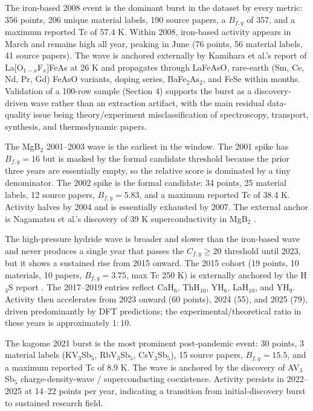 \documentclass[11pt]{article}
\begin{document}
The iron-based 2008 event is the dominant burst in the dataset by every metric: 356 points, 206 unique material labels, 190 source papers, a $B_{f,y}$ of 357, and a maximum reported Tc of 57.4 K. Within 2008, iron-based activity appears in March and remains high all year, peaking in June (76 points, 56 material labels, 41 source papers). The wave is anchored externally by Kamihara et al.'s report of La[O$_{1-x}$F$_x$]FeAs at 26 K \cite{kamihara2008iron} and propagates through LaFeAsO, rare-earth (Sm, Ce, Nd, Pr, Gd) FeAsO variants, doping series, BaFe$_2$As$_2$, and FeSe within months. Validation of a 100-row sample (Section 4) supports the burst as a discovery-driven wave rather than an extraction artifact, with the main residual data-quality issue being theory/experiment misclassification of spectroscopy, transport, synthesis, and thermodynamic papers.

The MgB$_2$ 2001--2003 wave is the earliest in the window. The 2001 spike has $B_{f,y}=16$ but is masked by the formal candidate threshold because the prior three years are essentially empty, so the relative score is dominated by a tiny denominator. The 2002 spike is the formal candidate: 34 points, 25 material labels, 12 source papers, $B_{f,y}=5.83$, and a maximum reported Tc of 38.4 K. Activity halves by 2004 and is essentially exhausted by 2007. The external anchor is Nagamatsu et al.'s discovery of 39 K superconductivity in MgB$_2$ \cite{nagamatsu2001mgb2}.

The high-pressure hydride wave is broader and slower than the iron-based wave and never produces a single year that passes the $C_{f,y}\geq 20$ threshold until 2023, but it shows a sustained rise from 2015 onward. The 2015 cohort (19 points, 10 materials, 10 papers, $B_{f,y}=3.75$, max Tc 250 K) is externally anchored by the H$_3$S report \cite{drozdov2015h3s}. The 2017--2019 entries reflect CaH$_6$, ThH$_{10}$, YH$_6$, LaH$_{10}$, and YH$_9$. Activity then accelerates from 2023 onward (60 points), 2024 (55), and 2025 (79), driven predominantly by DFT predictions; the experimental/theoretical ratio in these years is approximately $1{:}10$.

The kagome 2021 burst is the most prominent post-pandemic event: 30 points, 3 material labels (KV$_3$Sb$_5$, RbV$_3$Sb$_5$, CsV$_3$Sb$_5$), 15 source papers, $B_{f,y}=15.5$, and a maximum reported Tc of 8.9 K. The wave is anchored by the discovery of AV$_3$Sb$_5$ charge-density-wave / superconducting coexistence. Activity persists in 2022--2025 at 14--22 points per year, indicating a transition from initial-discovery burst to sustained research field.
\end{document}
